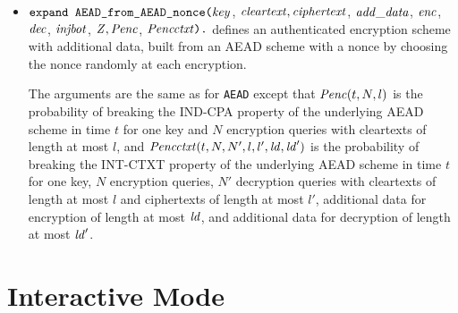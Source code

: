 \documentclass{article}
\begin{document}
\begin{itemize}
\item 
   $\texttt{expand\ AEAD\_from\_AEAD\_nonce(}\vn{key}$, $\mathit{cleartext},
   \mathit{ciphertext}$, $\mathit{add\_data}$, $\mathit{enc}$, $\mathit{dec}$, $\mathit{injbot}$, $\mathit{Z},
   \mathit{Penc}$, $\mathit{Pencctxt}\texttt{).}$ defines an authenticated
   encryption scheme with additional data, built from an AEAD scheme with a nonce
   by choosing the nonce randomly at each encryption.

   The arguments are the same as for
   \texttt{AEAD} except that $\mathit{Penc}(t, N,
   l)$ is the probability of breaking the IND-CPA property of the
   underlying AEAD scheme in time $t$ for one key and $N$ encryption
   queries with cleartexts of length at most $l$, and
   $\mathit{Pencctxt}(t, N, N', l, l', \mathit{ld}, \mathit{ld}')$ is the
   probability of breaking the INT-CTXT property of the underlying
   AEAD scheme in time $t$ for one key, $N$ encryption queries, $N'$
   decryption queries with cleartexts of length at most $l$ and
   ciphertexts of length at most $l'$, additional data for encryption
   of length at most $\mathit{ld}$, and additional data for decryption of
   length at most $\mathit{ld}'$.
   
\end{itemize}

\fussy

\section{Interactive Mode}\label{sec:interact}
\end{document}

